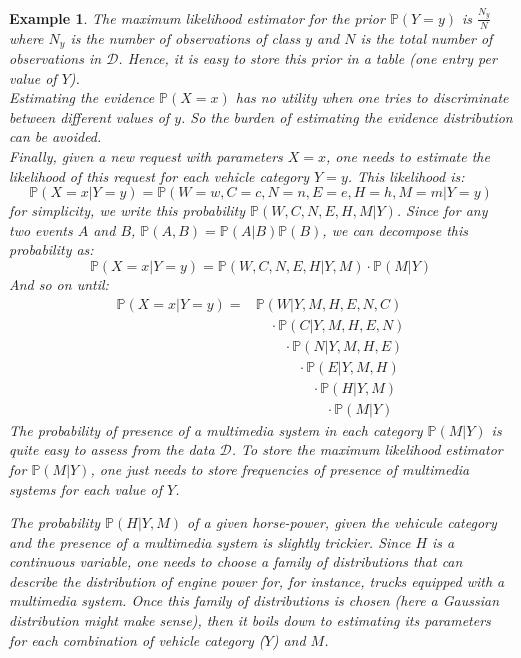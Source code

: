 \documentclass{article}
\newtheorem*{example}{Example}
\begin{document}
\begin{example}
The maximum likelihood estimator for the prior $\mathbb{P}(Y=y)$ is $\frac{N_y}{N}$ where $N_y$ is the number of observations of class $y$ and $N$ is the total number of observations in $\mathcal{D}$. Hence, it is easy to store this prior in a table (one entry per value of $Y$).\\
Estimating the evidence $\mathbb{P}(X=x)$ has no utility when one tries to discriminate between different values of $y$. So the burden of estimating the evidence distribution can be avoided.\\
Finally, given a new request with parameters $X=x$, one needs to estimate the likelihood of this request for each vehicle category $Y=y$. This likelihood is:
\begin{equation*}
\mathbb{P}(X=x|Y=y) = \mathbb{P}(W=w,C=c,N=n,E=e,H=h,M=m|Y=y)
\end{equation*}
for simplicity, we write this probability $\mathbb{P}(W,C,N,E,H,M|Y)$.
Since for any two events $A$ and $B$, $\mathbb{P}(A, B) = \mathbb{P}(A|B) \mathbb{P}(B)$, we can decompose this probability as:
\begin{equation*}
\mathbb{P}(X=x|Y=y) = \mathbb{P}(W,C,N,E,H|Y,M)\cdot \mathbb{P}(M|Y)
\end{equation*}
And so on until:
\begin{align*}
\mathbb{P}(X=x|Y=y) = & \mathbb{P}(W|Y,M,H,E,N,C) \\
&\quad \cdot\mathbb{P}(C|Y,M,H,E,N)\\
&\quad \quad \cdot\mathbb{P}(N|Y,M,H,E)\\
&\quad\quad\quad \cdot\mathbb{P}(E|Y,M,H)\\
&\quad\quad\quad\quad \cdot\mathbb{P}(H|Y,M)\\
&\quad\quad\quad\quad\quad \cdot\mathbb{P}(M|Y)
\end{align*}
The probability of presence of a multimedia system in each category $\mathbb{P}(M|Y)$ is quite easy to assess from the data $\mathcal{D}$. To store the maximum likelihood estimator for $\mathbb{P}(M|Y)$, one just needs to store frequencies of presence of multimedia systems for each value of $Y$.

The probability $\mathbb{P}(H|Y,M)$ of a given horse-power, given the vehicule category and the presence of a multimedia system is slightly trickier. Since $H$ is a continuous variable, one needs to choose a family of distributions that can describe the distribution of engine power for, for instance, trucks equipped with a multimedia system. Once this family of distributions is chosen (here a Gaussian distribution might make sense), then it boils down to estimating its parameters for each combination of vehicle category ($Y$) and $M$.


\end{example}
\end{document}

